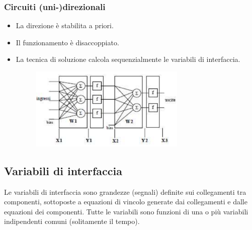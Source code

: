 \subsubsection*{Circuiti (uni-)direzionali}
\begin{itemize}
    \item La direzione è stabilita a priori.
    \item Il funzionamento è disaccoppiato.
    \item La tecnica di soluzione calcola sequenzialmente le variabili di interfaccia.
    \begin{figure}[H]
        \centering
        \includegraphics[width=0.7\textwidth]{capitoli/capitolo1/immagini/image3.png}
    \end{figure}
\end{itemize}

\subsection*{Variabili di interfaccia}
Le variabili di interfaccia sono grandezze (segnali) definite sui collegamenti tra componenti, sottoposte a equazioni di vincolo generate dai collegamenti e dalle equazioni dei componenti. 
Tutte le variabili sono funzioni di una o più variabili indipendenti comuni (solitamente il tempo).

